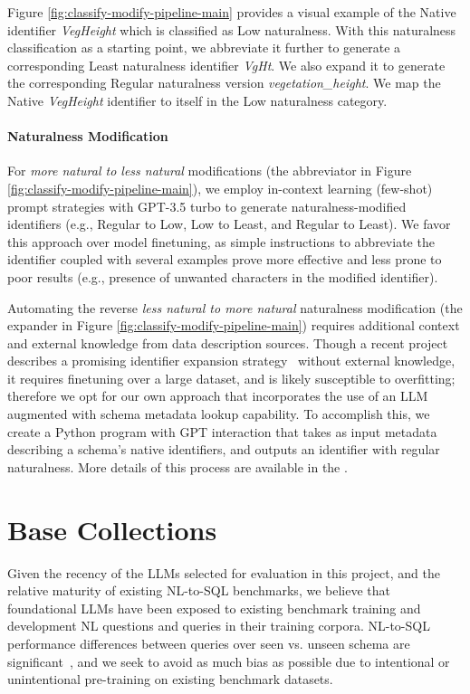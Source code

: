 Figure \ref{fig:classify-modify-pipeline-main} provides a visual example of the Native identifier \emph{VegHeight} which is classified as Low naturalness.
With this naturalness classification as a starting point, we abbreviate it further to generate a corresponding Least naturalness identifier \emph{VgHt}.
We also expand it to generate the corresponding Regular naturalness version \emph{vegetation\_height}.
We map the Native \emph{VegHeight} identifier to itself in the Low naturalness category.

\paragraph{\textbf{Naturalness Modification}}
For \emph{more natural to less natural} modifications (the abbreviator in Figure \ref{fig:classify-modify-pipeline-main}), we employ in-context learning (few-shot) prompt strategies with GPT-3.5 turbo to generate naturalness-modified identifiers (e.g., Regular to Low, Low to Least, and Regular to Least).
We favor this approach over model finetuning, as simple instructions to abbreviate the identifier coupled with several examples prove more effective and less prone to poor results (e.g., presence of unwanted characters in the modified identifier).

Automating the reverse \emph{less natural to more natural} naturalness modification (the expander in Figure \ref{fig:classify-modify-pipeline-main}) requires additional context and external knowledge from data description sources.
Though a recent project describes a promising identifier expansion strategy~\cite{nameguess} without external knowledge, it requires finetuning over a large dataset, and is likely susceptible to overfitting; therefore we opt for our own approach that incorporates the use of an LLM augmented with schema metadata lookup capability.
To accomplish this, we create a Python program with GPT interaction that takes as input metadata describing a schema's native identifiers, and outputs an identifier with regular naturalness.
More details of this process are available in the \fi.


\section{Base Collections}


Given the recency of the LLMs selected for evaluation in this project, and the relative maturity of existing NL-to-SQL benchmarks, we believe that foundational LLMs have been exposed to existing benchmark training and development NL questions and queries in their training corpora.
NL-to-SQL performance differences between queries over seen vs. unseen schema are significant~\cite{49288}, and we seek to avoid as much bias as possible due to intentional or unintentional pre-training on existing benchmark datasets.

